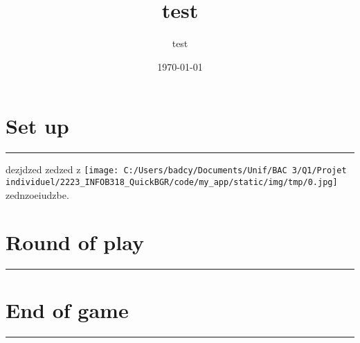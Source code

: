 \documentclass{scrartcl}%
\title{test}%
\author{test}%
\date{\today}%
\begin{document}
%
\normalsize%
\maketitle\thispagestyle{header}%
\pagestyle{header}%
\sectionfont{\color{blue}}%
\subsectionfont{\color{blue}}%
\subsubsectionfont{\color{blue}}%
\section{ Set up
}%
\label{sec:Setup}%
\textcolor{blue}{\rule{18cm}{0.07cm}}\break%
dezjdzed zedzed z%
\texttt{[image: C:/Users/badcy/Documents/Unif/BAC 3/Q1/Projet individuel/2223\_INFOB318\_QuickBGR/code/my\_app/static/img/tmp/0.jpg]}%
 zednzoeiudzbe.
%



%
\sectionfont{\color{mygreen}}%
\subsectionfont{\color{mygreen}}%
\subsubsectionfont{\color{mygreen}}%
\section{ Round of play
}%
\label{sec:Roundofplay}%
\textcolor{mygreen}{\rule{18cm}{0.07cm}}\break

%
\sectionfont{\color{red}}%
\subsectionfont{\color{red}}%
\subsubsectionfont{\color{red}}%
\section{ End of game}%
\label{sec:Endofgame}%
\textcolor{red}{\rule{18cm}{0.07cm}}\break

%
\end{document}

